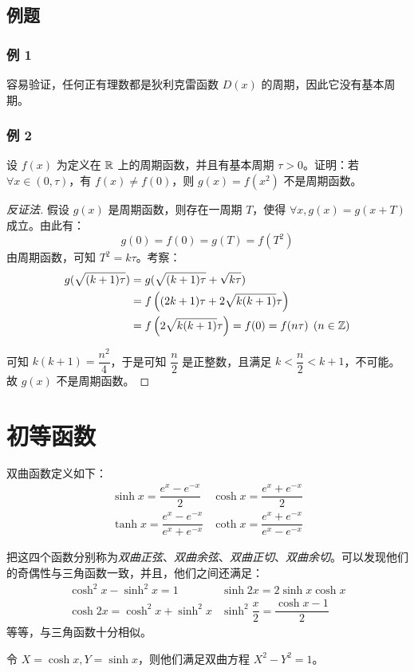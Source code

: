 \subsection{例题}

\subsubsection*{例 1}

容易验证，任何正有理数都是狄利克雷函数 $D(x)$ 的周期，因此它没有基本周期。

\subsubsection*{例 2}

设 $f(x)$ 为定义在 $\mathbb R$ 上的周期函数，并且有基本周期 $\tau > 0$。证明：若 $\forall x \in (0, \tau)$，有 $f(x) \ne f(0)$，则 $g(x) = f(x^2)$ 不是周期函数。

\begin{proof}[反证法]
	假设 $g(x)$ 是周期函数，则存在一周期 $T$，使得 $\forall x, g(x) = g(x + T)$ 成立。由此有：
	$$
	g(0) = f(0) = g(T) = f(T^2)
	$$
	由周期函数，可知 $T^2 = k \tau$。考察：
	$$
	\begin{aligned}
		g(\sqrt{(k + 1)\tau}) &= g(\sqrt{(k + 1)\tau} + \sqrt{k \tau})
		\\&=
		f \left( (2k + 1) \tau + 2 \sqrt{k (k + 1)} \tau \right)
		\\&=
		f \left(2 \sqrt{k(k + 1)} \tau \right) = f(0) = f(n \tau) \pod {n \in \mathbb Z}
	\end{aligned}
	$$

	可知 $k(k + 1) = \dfrac{n^2}{4}$，于是可知 $\dfrac{n}{2}$ 是正整数，且满足 $k < \dfrac{n}{2} < k + 1$，不可能。故 $g(x)$ 不是周期函数。
\end{proof}

\section{初等函数}

双曲函数定义如下：
$$
\begin{matrix}
	\sinh x = \dfrac{e^x - e^{-x}}{2} &
	\cosh x = \dfrac{e^x + e^{-x}}{2} \\
	\tanh x = \dfrac{e^x - e^{-x}}{e^x + e^{-x}} &
	\coth x = \dfrac{e^x + e^{-x}}{e^x - e^{-x}}
\end{matrix}
$$

把这四个函数分别称为\emph{双曲正弦}、\emph{双曲余弦}、\emph{双曲正切}、\emph{双曲余切}。可以发现他们的奇偶性与三角函数一致，并且，他们之间还满足：
$$
\begin{matrix}
	\cosh^2 x - \sinh^2 x = 1 &
	\sinh 2x = 2 \sinh x \cosh x \\
	\cosh 2x = \cosh^2 x + \sinh^2 x &
	\sinh^2 \dfrac{x}{2} = \dfrac{\cosh x - 1}{2}
\end{matrix}
$$
等等，与三角函数十分相似。

令 $X = \cosh x, Y = \sinh x$，则他们满足双曲方程 $X^2 - Y^2 = 1$。